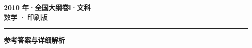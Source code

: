 \documentclass[zihao=5, a4paper]{ctexart}
\begin{document}
\begin{center}
  {\Large\bfseries 2010 年·全国大纲卷Ⅰ·文科}\\[4pt]
  {\large 数学 · 印刷版}
\end{center}
\medskip
{}

\par\bigskip\hrule\bigskip
{}
\begin{center}{\large\bfseries 参考答案与详细解析}\end{center}
\smallskip

\end{document}
